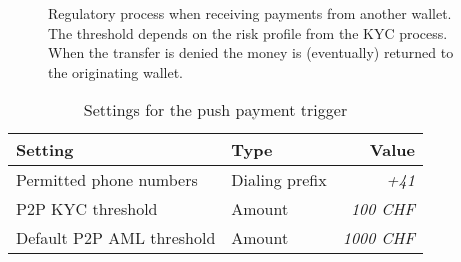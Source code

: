 \begin{figure}[h!]
\begin{center}
  \end{center}
  \caption{Regulatory process when receiving payments from another wallet.
    The threshold depends on the risk profile from the KYC process.
    When the transfer is denied the money is (eventually) returned to
    the originating wallet.}
\end{figure}


\begin{table}[h!]
  \caption{Settings for the push payment trigger}
  \begin{tabular}{l|l|r}
    {\bf Setting}             & {\bf Type}     & {\bf Value} \\ \hline \hline
    Permitted phone numbers   & Dialing prefix & {\em +41} \\
    P2P KYC threshold         & Amount         & {\em  100 CHF} \\
    Default P2P AML threshold & Amount         & {\em 1000 CHF} \\
  \end{tabular}
\end{table}
